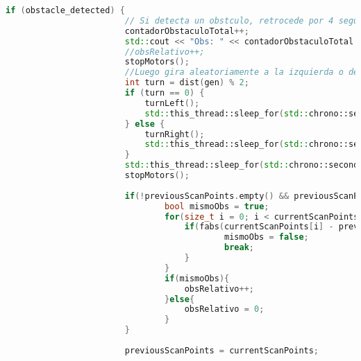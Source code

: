 \begin{lstlisting}[language={C++}, caption={Primer ajuste de c\'odigo}, label={PrimerAjuste}]
                    if (obstacle_detected) {
                        // Si detecta un obstculo, retrocede por 4 segundos
                        contadorObstaculoTotal++;
                        std::cout << "Obs: " << contadorObstaculoTotal << std::endl;
                        //obsRelativo++;
                        stopMotors();
                        //Luego gira aleatoriamente a la izquierda o derecha
                        int turn = dist(gen) % 2;
                        if (turn == 0) {
                            turnLeft();
                            std::this_thread::sleep_for(std::chrono::seconds(5));
                        } else {
                            turnRight();
                            std::this_thread::sleep_for(std::chrono::seconds(5));
                        }
                        std::this_thread::sleep_for(std::chrono::seconds(2));
                        stopMotors();
                        
                        if(!previousScanPoints.empty() && previousScanPoints.size() == currentScanPoints.size()){
                                bool mismoObs = true;
                                for(size_t i = 0; i < currentScanPoints.size(); ++i){
                                    if(fabs(currentScanPoints[i] - previousScanPoints[i]) > 0.05){
                                            mismoObs = false;
                                            break;
                                    }
                                }
                                if(mismoObs){
                                    obsRelativo++;
                                }else{
                                    obsRelativo = 0;
                                }
                        }
                        
                        previousScanPoints = currentScanPoints;
                        

\end{lstlisting}
